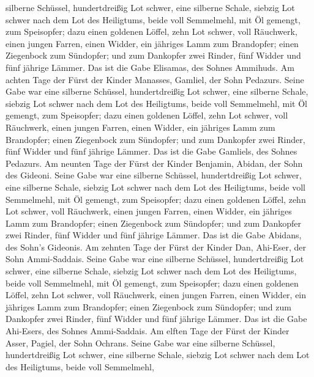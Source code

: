 silberne Schüssel, hundertdreißig Lot schwer, eine silberne Schale,
siebzig Lot schwer nach dem Lot des Heiligtums, beide voll Semmelmehl,
mit Öl gemengt, zum Speisopfer;  dazu einen goldenen
Löffel, zehn Lot schwer, voll Räuchwerk,  einen jungen
Farren, einen Widder, ein jähriges Lamm zum Brandopfer; 
einen Ziegenbock zum Sündopfer;  und zum Dankopfer zwei
Rinder, fünf Widder und fünf jährige Lämmer. Das ist die Gabe Elisamas,
des Sohnes Ammihuds.  Am achten Tage der Fürst der Kinder
Manasses, Gamliel, der Sohn Pedazurs.  Seine Gabe war eine
silberne Schüssel, hundertdreißig Lot schwer, eine silberne Schale,
siebzig Lot schwer nach dem Lot des Heiligtums, beide voll Semmelmehl,
mit Öl gemengt, zum Speisopfer;  dazu einen goldenen
Löffel, zehn Lot schwer, voll Räuchwerk,  einen jungen
Farren, einen Widder, ein jähriges Lamm zum Brandopfer; 
einen Ziegenbock zum Sündopfer;  und zum Dankopfer zwei
Rinder, fünf Widder und fünf jährige Lämmer. Das ist die Gabe Gamliels,
des Sohnes Pedazurs.  Am neunten Tage der Fürst der Kinder
Benjamin, Abidan, der Sohn des Gideoni.  Seine Gabe war
eine silberne Schüssel, hundertdreißig Lot schwer, eine silberne Schale,
siebzig Lot schwer nach dem Lot des Heiligtums, beide voll Semmelmehl,
mit Öl gemengt, zum Speisopfer;  dazu einen goldenen
Löffel, zehn Lot schwer, voll Räuchwerk,  einen jungen
Farren, einen Widder, ein jähriges Lamm zum Brandopfer; 
einen Ziegenbock zum Sündopfer;  und zum Dankopfer zwei
Rinder, fünf Widder und fünf jährige Lämmer. Das ist die Gabe Abidans,
des Sohn's Gideonis.  Am zehnten Tage der Fürst der Kinder
Dan, Ahi-Eser, der Sohn Ammi-Saddais.  Seine Gabe war eine
silberne Schüssel, hundertdreißig Lot schwer, eine silberne Schale,
siebzig Lot schwer nach dem Lot des Heiligtums, beide voll Semmelmehl,
mit Öl gemengt, zum Speisopfer;  dazu einen goldenen
Löffel, zehn Lot schwer, voll Räuchwerk,  einen jungen
Farren, einen Widder, ein jähriges Lamm zum Brandopfer; 
einen Ziegenbock zum Sündopfer;  und zum Dankopfer zwei
Rinder, fünf Widder und fünf jährige Lämmer. Das ist die Gabe Ahi-Esers,
des Sohnes Ammi-Saddais.  Am elften Tage der Fürst der
Kinder Asser, Pagiel, der Sohn Ochrans.  Seine Gabe war
eine silberne Schüssel, hundertdreißig Lot schwer, eine silberne Schale,
siebzig Lot schwer nach dem Lot des Heiligtums, beide voll Semmelmehl,
